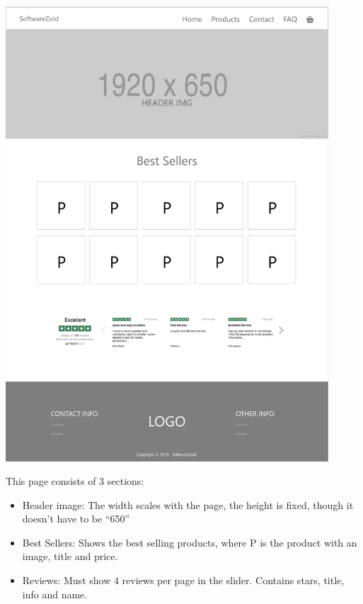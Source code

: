 \documentclass[11pt]{report}
\begin{document}
\begin{center}
\includegraphics[height=17cm]{page1}
\end{center}
\noindent This page consists of 3 sections:
\begin{itemize}
  \item Header image: The width scales with the page, the height is fixed, though it doesn’t have to be “650”
  \item Best Sellers: Shows the best selling products, where P is the product with an image, title and price.
  \item Reviews: Must show 4 reviews per page in the slider. Contains stars, title, info and name.
\end{itemize}
\end{document}
